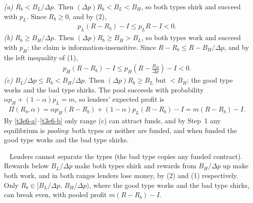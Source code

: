 \documentclass[11pt,a4paper]{article}
\newcommand{\answer}[1]{\par\smallskip\noindent\fbox{\textbf{Answer #1.}}~}
\begin{document}
\textit{(a) $R_b<B_L/\Delta p$.} Then $(\Delta p)R_b<B_L<B_H$, so both types shirk and succeed with $p_L$. Since $R_b\ge0$, and by (2),
\begin{align}
  p_L(R-R_b)-I \le p_L R - I < 0. \label{t3e6-a}
\end{align}
\textit{(b) $R_b\ge B_H/\Delta p$.} Then $(\Delta p)R_b\ge B_H>B_L$, so both types work and succeed with $p_H$: the claim is information-insensitive. Since $R-R_b\le R-B_H/\Delta p$, and by the left inequality of (1),
\begin{align}
  p_H(R-R_b)-I \le p_H\left(R-\frac{B_H}{\Delta p}\right)-I < 0. \label{t3e6-b}
\end{align}
\textit{(c) $B_L/\Delta p\le R_b<B_H/\Delta p$.} Then $(\Delta p)R_b\ge B_L$ but $<B_H$: the good type works and the bad type shirks. The pool succeeds with probability $\alpha p_H+(1-\alpha)p_L=m$, so lenders' expected profit is
\begin{align}
  \Pi(R_b,\alpha) = \alpha p_H(R-R_b)+(1-\alpha)p_L(R-R_b) - I = m(R-R_b) - I. \label{t3e6-c}
\end{align}
By \eqref{t3e6-a}--\eqref{t3e6-b} only range (c) can attract funds, and by Step~1 any equilibrium is \emph{pooling}: both types or neither are funded, and when funded the good type works and the bad type shirks.

\answer{(i)} Lenders cannot separate the types (the bad type copies any funded contract). Rewards below $B_L/\Delta p$ make both types shirk and rewards from $B_H/\Delta p$ up make both work, and in both ranges lenders lose money, by (2) and (1) respectively. Only $R_b\in[B_L/\Delta p,\,B_H/\Delta p)$, where the good type works and the bad type shirks, can break even, with pooled profit $m(R-R_b)-I$.
\end{document}
